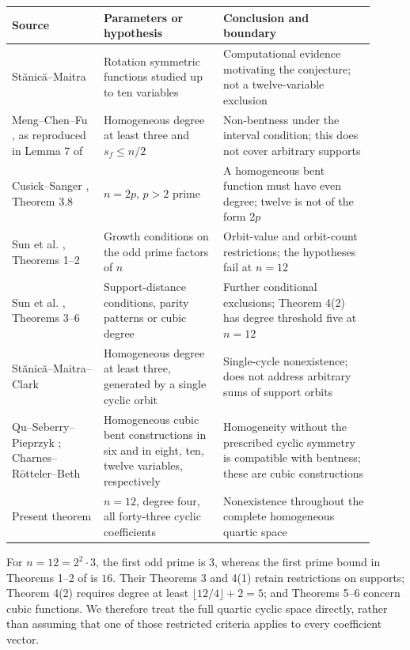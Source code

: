 \documentclass[pdflatex,sn-mathphys-num]{sn-jnl}
\begin{document}
{\footnotesize
\setlength{\tabcolsep}{3pt}

\begin{longtable}{@{}>{\raggedright\arraybackslash}p{0.23\linewidth}>{\raggedright\arraybackslash}p{0.3\linewidth}>{\raggedright\arraybackslash}p{0.38\linewidth}@{}}
\toprule
Source & Parameters or hypothesis & Conclusion and boundary \\
\midrule\endhead
St\u{a}nic\u{a}--Maitra \cite{ref2} & Rotation symmetric functions studied up to ten variables & Computational evidence motivating the conjecture; not a twelve-variable exclusion \\
Meng--Chen--Fu \cite{ref3}, as reproduced in Lemma 7 of \cite{ref4} & Homogeneous degree at least three and $s_f\le n/2$ & Non-bentness under the interval condition; this does not cover arbitrary supports \\
Cusick--Sanger \cite{ref8}, Theorem 3.8 & $n=2p$, $p>2$ prime & A homogeneous bent function must have even degree; twelve is not of the form $2p$ \\
Sun et al. \cite{ref4}, Theorems 1--2 & Growth conditions on the odd prime factors of $n$ & Orbit-value and orbit-count restrictions; the hypotheses fail at $n=12$ \\
Sun et al. \cite{ref4}, Theorems 3--6 & Support-distance conditions, parity patterns or cubic degree & Further conditional exclusions; Theorem 4(2) has degree threshold five at $n=12$ \\
St\u{a}nic\u{a}--Maitra--Clark \cite{ref5} & Homogeneous degree at least three, generated by a single cyclic orbit & Single-cycle nonexistence; does not address arbitrary sums of support orbits \\
Qu--Seberry--Pieprzyk \cite{ref6}; Charnes--Rötteler--Beth \cite{ref7} & Homogeneous cubic bent constructions in six and in eight, ten, twelve variables, respectively & Homogeneity without the prescribed cyclic symmetry is compatible with bentness; these are cubic constructions \\
Present theorem & $n=12$, degree four, all forty-three cyclic coefficients & Nonexistence throughout the complete homogeneous quartic space \\
\bottomrule
\end{longtable}

}

For $n=12=2^2\cdot3$, the first odd prime is $3$, whereas the first prime bound in Theorems 1--2 of \cite{ref4} is $16$. Their Theorems 3 and 4(1) retain restrictions on supports; Theorem 4(2) requires degree at least $\lfloor12/4\rfloor+2=5$; and Theorems 5--6 concern cubic functions. We therefore treat the full quartic cyclic space directly, rather than assuming that one of those restricted criteria applies to every coefficient vector.
\end{document}
